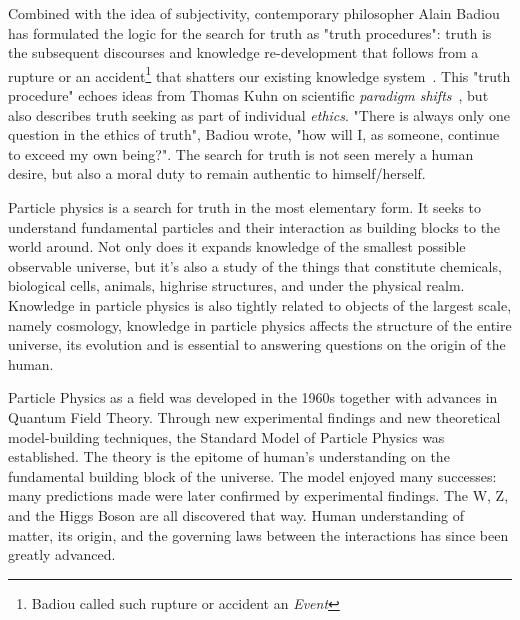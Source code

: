Combined with the idea of subjectivity, contemporary philosopher Alain Badiou has formulated the logic for the search for truth as "truth procedures": truth is the subsequent discourses and knowledge re-development that follows from a rupture or an accident\footnote{Badiou called such rupture or accident an \textit{Event}} that shatters our existing knowledge system~\cite{badiou2007being}. This "truth procedure" echoes ideas from Thomas Kuhn on scientific \textit{paradigm
shifts}~\cite{kuhn2021structure}, but also describes truth seeking as part of individual \textit{ethics}. "There is always only one question in the ethics of truth", Badiou wrote, "how will I, as someone, continue to exceed my own being?"\cite{badiou2002ethics}. The search for truth is not seen merely a human desire, but also a moral duty to remain authentic to himself/herself.


Particle physics is a search for truth in the most elementary form. It seeks to understand fundamental particles and their interaction as building blocks to the world around. Not only does it expands knowledge of the smallest possible observable universe, but it's also a study of the things that constitute chemicals, biological cells, animals, highrise structures, and  under the physical realm. Knowledge in particle physics is also tightly related to objects of the largest scale, namely cosmology, knowledge in particle physics affects the structure of the entire universe, its evolution and is essential to answering questions on the origin of the human.

Particle Physics as a field was developed in the 1960s together with advances in Quantum Field Theory. Through new experimental findings and new theoretical model-building techniques, the Standard Model of Particle Physics was established. The theory is the epitome of human's understanding on the fundamental building block of the universe. The model enjoyed many successes: many predictions made were later confirmed by experimental findings. The W, Z, and the Higgs Boson are all discovered that way. Human
understanding of matter, its origin, and the governing laws between the interactions has since been greatly advanced. 

